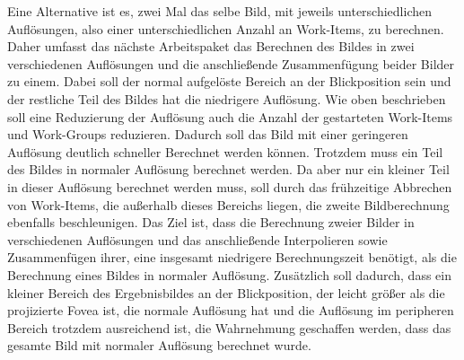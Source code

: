 Eine Alternative ist es, zwei Mal das selbe Bild, mit jeweils unterschiedlichen Auflösungen, also einer unterschiedlichen Anzahl an Work-Items, zu berechnen.
Daher umfasst das nächste Arbeitspaket das Berechnen des Bildes in zwei verschiedenen Auflösungen und die anschließende Zusammenfügung beider Bilder zu einem.
Dabei soll der normal aufgelöste Bereich an der Blickposition sein und der restliche Teil des Bildes hat die niedrigere Auflösung.
Wie oben beschrieben soll eine Reduzierung der Auflösung auch die Anzahl der gestarteten Work-Items und Work-Groups reduzieren.
Dadurch soll das Bild mit einer geringeren Auflösung deutlich schneller Berechnet werden können.
Trotzdem muss ein Teil des Bildes in normaler Auflösung berechnet werden.
Da aber nur ein kleiner Teil in dieser Auflösung berechnet werden muss, soll durch das frühzeitige Abbrechen von Work-Items, die außerhalb dieses Bereichs liegen, die zweite Bildberechnung ebenfalls beschleunigen.
Das Ziel ist, dass die Berechnung zweier Bilder in verschiedenen Auflösungen und das anschließende Interpolieren sowie Zusammenfügen ihrer, eine insgesamt niedrigere Berechnungszeit benötigt, als die Berechnung eines Bildes in normaler Auflösung.
Zusätzlich soll dadurch, dass ein kleiner Bereich des Ergebnisbildes an der Blickposition, der leicht größer als die projizierte Fovea ist, die normale Auflösung hat und die Auflösung im peripheren Bereich trotzdem ausreichend ist, die Wahrnehmung geschaffen werden, dass das gesamte Bild mit normaler Auflösung berechnet wurde.


